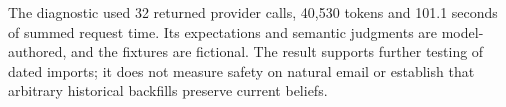 The diagnostic used 32 returned provider calls, 40,530 tokens and 101.1 seconds
of summed request time. Its expectations and semantic judgments are model-authored,
and the fixtures are fictional. The result supports further testing of dated
imports; it does not measure safety on natural email or establish that arbitrary
historical backfills preserve current beliefs.
